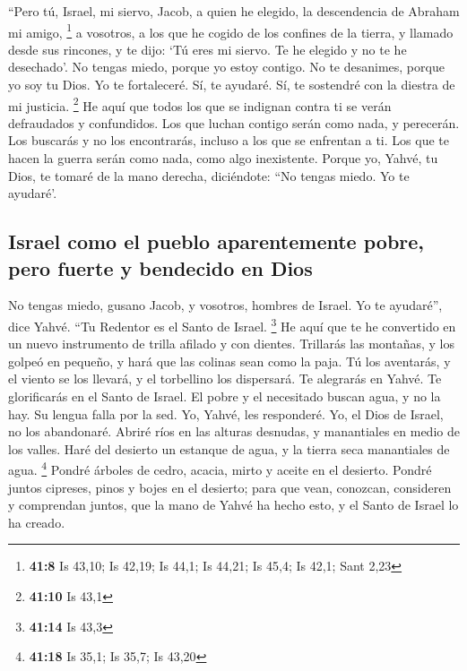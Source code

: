  ``Pero tú, Israel, mi siervo, Jacob, a quien he elegido,
la descendencia de Abraham mi amigo, \footnote{\textbf{41:8} Is 43,10;
  Is 42,19; Is 44,1; Is 44,21; Is 45,4; Is 42,1; Sant 2,23}
 a vosotros, a los que he cogido de los confines de la
tierra, y llamado desde sus rincones, y te dijo: `Tú eres mi siervo. Te
he elegido y no te he desechado'.  No tengas miedo,
porque yo estoy contigo. No te desanimes, porque yo soy tu Dios. Yo te
fortaleceré. Sí, te ayudaré. Sí, te sostendré con la diestra de mi
justicia. \footnote{\textbf{41:10} Is 43,1}  He aquí que
todos los que se indignan contra ti se verán defraudados y confundidos.
Los que luchan contigo serán como nada, y perecerán.  Los
buscarás y no los encontrarás, incluso a los que se enfrentan a ti. Los
que te hacen la guerra serán como nada, como algo inexistente.
 Porque yo, Yahvé, tu Dios, te tomaré de la mano derecha,
diciéndote: ``No tengas miedo. Yo te ayudaré'.

\hypertarget{israel-como-el-pueblo-aparentemente-pobre-pero-fuerte-y-bendecido-en-dios}{%
\subsection{Israel como el pueblo aparentemente pobre, pero fuerte y
bendecido en
Dios}\label{israel-como-el-pueblo-aparentemente-pobre-pero-fuerte-y-bendecido-en-dios}}

 No tengas miedo, gusano Jacob, y vosotros, hombres de
Israel. Yo te ayudaré'', dice Yahvé. ``Tu Redentor es el Santo de
Israel. \footnote{\textbf{41:14} Is 43,3}  He aquí que te
he convertido en un nuevo instrumento de trilla afilado y con dientes.
Trillarás las montañas, y los golpeó en pequeño, y hará que las colinas
sean como la paja.  Tú los aventarás, y el viento se los
llevará, y el torbellino los dispersará. Te alegrarás en Yahvé. Te
glorificarás en el Santo de Israel.  El pobre y el
necesitado buscan agua, y no la hay. Su lengua falla por la sed. Yo,
Yahvé, les responderé. Yo, el Dios de Israel, no los abandonaré.
 Abriré ríos en las alturas desnudas, y manantiales en
medio de los valles. Haré del desierto un estanque de agua, y la tierra
seca manantiales de agua. \footnote{\textbf{41:18} Is 35,1; Is 35,7; Is
  43,20}  Pondré árboles de cedro, acacia, mirto y aceite
en el desierto. Pondré juntos cipreses, pinos y bojes en el desierto;
 para que vean, conozcan, consideren y comprendan juntos,
que la mano de Yahvé ha hecho esto, y el Santo de Israel lo ha creado.

